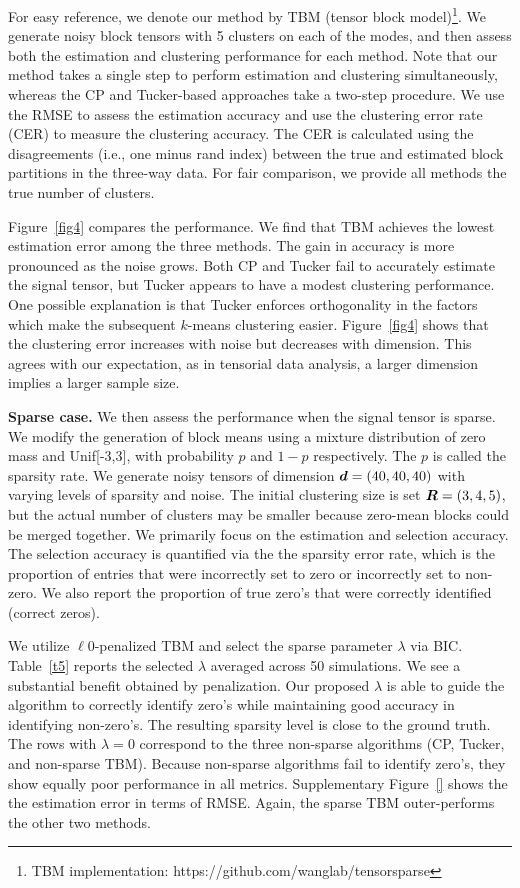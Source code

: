 \documentclass{article}
\begin{document}
For easy reference, we denote our method by TBM (tensor block model)\footnote{TBM implementation: https://github.com/wanglab/tensorsparse}. We generate noisy block tensors with 5 clusters on each of the modes, and then assess both the estimation and clustering performance for each method. Note that our method takes a single step to perform estimation and clustering simultaneously, whereas the CP and Tucker-based approaches take a two-step procedure. We use the RMSE to assess the estimation accuracy and use the clustering error rate (CER) to measure the clustering accuracy. The CER is calculated using the disagreements (i.e., one minus rand index) between the true and estimated block partitions in the three-way data. For fair comparison, we provide all methods the true number of clusters. 

Figure~\ref{fig4} compares the performance. We find that TBM achieves the lowest estimation error among the three methods. The gain in accuracy is more pronounced as the noise grows. Both CP and Tucker fail to accurately estimate the signal tensor, but Tucker appears to have a modest clustering performance. One possible explanation is that Tucker enforces orthogonality in the factors which make the subsequent $k$-means clustering easier. Figure~\ref{fig4} shows that the clustering error increases with noise but decreases with dimension. This agrees with our expectation, as in tensorial data analysis, a larger dimension implies a larger sample size. 



\textbf{Sparse case.} We then assess the performance when the signal tensor is sparse. We modify the generation of block means using a mixture distribution of zero mass and Unif[-3,3], with probability $p$ and $1-p$ respectively. The $p$ is called the sparsity rate. We generate noisy tensors of dimension $\bm{d}=(40,40,40)$ with varying levels of sparsity and noise. The initial clustering size is set $\bm{R}=(3,4,5)$, but the actual number of clusters may be smaller because zero-mean blocks could be merged together. We primarily focus on the estimation and selection accuracy. The selection accuracy is quantified via the the sparsity error rate, which is the proportion of entries that were incorrectly set to zero or incorrectly set to non-zero. We also report the proportion of true zero's that were correctly identified (correct zeros). 

We utilize $\ell0$-penalized TBM and select the sparse parameter $\lambda$ via BIC. Table~\ref{t5} reports the selected $\lambda$ averaged across 50 simulations. We see a substantial benefit obtained by penalization. Our proposed $\lambda$ is able to guide the algorithm to correctly identify zero's while maintaining good accuracy in identifying non-zero's. The resulting sparsity level is close to the ground truth. The rows with $\lambda=0$ correspond to the three non-sparse algorithms (CP, Tucker, and non-sparse TBM). Because non-sparse algorithms fail to identify zero's, they show equally poor performance in all metrics. Supplementary Figure~\ref{} shows the the estimation error in terms of RMSE. Again, the sparse TBM outer-performs the other two methods. 
\end{document}
